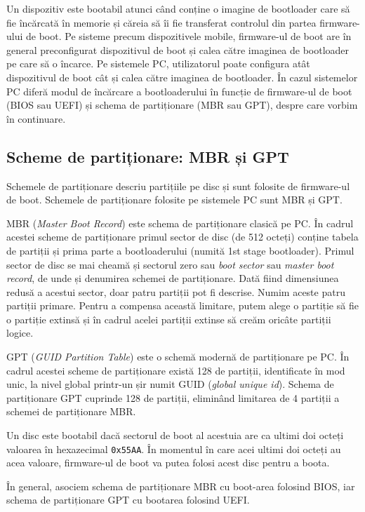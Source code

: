 Un dispozitiv este bootabil atunci când conține o imagine de bootloader care să
fie încărcată în memorie și căreia să îi fie transferat controlul din partea
firmware-ului de boot. Pe sisteme precum dispozitivele mobile, firmware-ul de
boot are în general preconfigurat dispozitivul de boot și calea către imaginea
de bootloader pe care să o încarce. Pe sistemele PC, utilizatorul poate
configura atât dispozitivul de boot cât și calea către imaginea de bootloader.
În cazul sistemelor PC diferă modul de încărcare a bootloaderului în funcție de
firmware-ul de boot (BIOS sau UEFI) și schema de partiționare (MBR sau GPT),
despre care vorbim în continuare.

\subsection{Scheme de partiționare: MBR și GPT}
\label{sec:boot:bootdev:scheme}

Schemele de partiționare descriu partițiile pe disc și sunt folosite de firmware-ul de boot.
Schemele de partiționare folosite pe sistemele PC sunt MBR și GPT.

MBR (\textit{Master Boot Record}) este schema de partiționare clasică pe PC. În cadrul
acestei scheme de partiționare primul sector de disc (de 512 octeți) conține
tabela de partiții și prima parte a bootloaderului (numită 1st stage
bootloader). Primul sector de disc se mai cheamă și sectorul zero sau \textit{boot
sector} sau \textit{master boot record}, de unde și denumirea schemei de partiționare.
Dată fiind dimensiunea redusă a acestui sector, doar patru partiții pot fi
descrise. Numim aceste patru partiții primare. Pentru a compensa această
limitare, putem alege o partiție să fie o partiție extinsă și în cadrul acelei
partiții extinse să creăm oricâte partiții logice.

GPT (\textit{GUID Partition Table}) este o schemă modernă de partiționare pe PC. În
cadrul acestei scheme de partiționare există 128 de partiții, identificate în
mod unic, la nivel global printr-un șir numit GUID (\textit{global unique id}). Schema de
partiționare GPT cuprinde 128 de partiții, eliminând limitarea de 4 partiții a
schemei de partiționare MBR.

Un disc este bootabil dacă sectorul de boot al acestuia are ca ultimi doi octeți
valoarea în hexazecimal \texttt{0x55AA}. În momentul în care acei ultimi doi octeți au
acea valoare, firmware-ul de boot va putea folosi acest disc pentru a boota.

În general, asociem schema de partiționare MBR cu boot-area folosind BIOS, iar
schema de partiționare GPT cu bootarea folosind UEFI.

